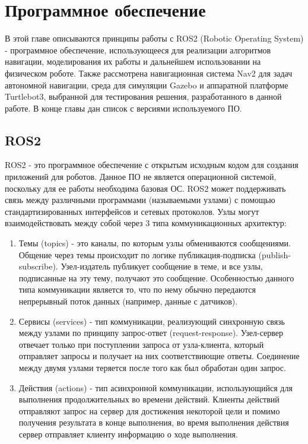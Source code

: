 \chapter{Программное обеспечение}
\label{ch:chap2}
В этой главе описываются принципы работы с ROS2 (Robotic Operating System) - программное обеспечение, использующееся для реализации алгоритмов навигации, моделирования их работы и дальнейшем использовании на физическом роботе. Также рассмотрена навигационная система Nav2 для задач автономной навигации, среда для симуляции Gazebo и аппаратной платформе Turtlebot3, выбранной для тестирования решения, разработанного в данной работе. В конце главы дан список с версиями используемого ПО.
\section{ROS2}
ROS2 - это программное обеспечение с открытым исходным кодом для создания приложений для роботов. Данное ПО не является операционной системой, поскольку для ее работы необходима базовая ОС. ROS2 может поддерживать связь между различными программами (называемыми узлами) с помощью стандартизированных интерфейсов и сетевых протоколов. Узлы могут взаимодействовать между собой через 3 типа коммуникационных архитектур:
\begin{enumerate}
    \item Темы (topics) - это каналы, по которым узлы обмениваются сообщениями. Общение через темы происходит по логике публикация-подписка (publish-subscribe). Узел-издатель публикует сообщение в теме, и все узлы, подписанные на эту тему, получают это сообщение. Особенностью данного типа коммуникации является то, что по нему обычно передаются непрерывный поток данных (например, данные с датчиков).
    \item Сервисы (services) - тип коммуникации, реализующий синхронную связь между узлами по принципу запрос-ответ (request-response). Узел-сервер отвечает только при поступлении запроса от узла-клиента, который отправляет запросы и получает на них соответствиющие ответы. Соединение между двумя узлами теряется после того как был обработан один запрос.
    \item Действия (actions) - тип асинхронной коммуникации, использующийся для выполнения продолжительных во времени действий. Клиенты действий отправляют запрос на сервер для достижения некоторой цели и помимо получения результата в конце выполнения, во время выполнения действия сервер отправляет клиенту информацию о ходе выполнения.
\end{enumerate}

